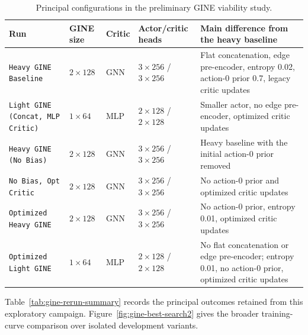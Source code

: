 {\begin{table}[H]
  \color{red}
  \centering
  \scriptsize
  \caption{Principal configurations in the preliminary GINE viability study.}
  \label{tab:gine-reproducibility-variants}
  \label{tab:gine-run-configurations}
  \label{tab:heavy-gine-configurations}
  \setlength{\tabcolsep}{3pt}
  \begin{tabular}{L{0.23\textwidth}L{0.13\textwidth}L{0.12\textwidth}L{0.16\textwidth}L{0.28\textwidth}}
    \toprule
    Run & GINE size & Critic & Actor/critic heads & Main difference from the heavy baseline \\
    \midrule
    \texttt{Heavy GINE Baseline}
      & $2\times128$ & GNN & $3\times256$ / $3\times256$
      & Flat concatenation, edge pre-encoder, entropy 0.02, action-0 prior 0.7,
        legacy critic updates \\
    \texttt{Light GINE (Concat, MLP Critic)}
      & $1\times64$ & MLP & $2\times128$ / $2\times128$
      & Smaller actor, no edge pre-encoder, optimized critic updates \\
    \texttt{Heavy GINE (No Bias)}
      & $2\times128$ & GNN & $3\times256$ / $3\times256$
      & Heavy baseline with the initial action-0 prior removed \\
    \texttt{No Bias, Opt Critic}
      & $2\times128$ & GNN & $3\times256$ / $3\times256$
      & No action-0 prior and optimized critic updates \\
    \texttt{Optimized Heavy GINE}
      & $2\times128$ & GNN & $3\times256$ / $3\times256$
      & No action-0 prior, entropy 0.01, optimized critic updates \\
    \texttt{Optimized Light GINE}
      & $1\times64$ & MLP & $2\times128$ / $2\times128$
      & No flat concatenation or edge pre-encoder; entropy 0.01, no action-0
        prior, optimized critic updates \\
    \bottomrule
  \end{tabular}
\end{table}

Table~\ref{tab:gine-rerun-summary} records the principal outcomes retained
from this exploratory campaign. Figure~\ref{fig:gine-best-search2} gives the
broader training-curve comparison over isolated development variants.

}
